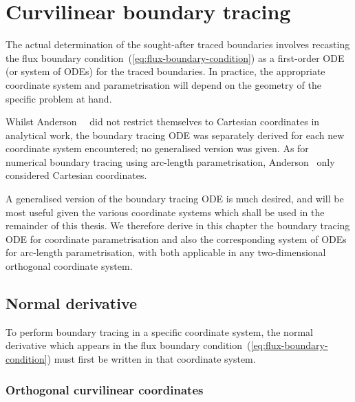 \chapter{Curvilinear boundary tracing}
\label{ch:curvilinear}

The actual determination of the sought-after traced boundaries involves
recasting the flux boundary condition~(\ref{eq:flux-boundary-condition})
as a first-order ODE (or system of ODEs) for the traced boundaries.
In practice, the appropriate coordinate system and parametrisation
will depend on the geometry of the specific problem at hand.

Whilst Anderson~\etal~\cite{
  anderson-2007-boundary-tracing-i-theory,
  anderson-2007-boundary-tracing-ii-applications
}
did not restrict themselves to Cartesian coordinates in analytical work,
the boundary tracing ODE was separately derived
for each new coordinate system encountered;
no generalised version was given.
As for numerical boundary tracing using arc-length parametrisation,
Anderson~\cite{anderson-2002-thesis-boundary-tracing-pdes}
only considered Cartesian coordinates.

A generalised version of the boundary tracing ODE is much desired,
and will be most useful given the various coordinate systems
which shall be used in the remainder of this thesis.
We therefore derive in this chapter
the boundary tracing ODE for coordinate parametrisation
and also the corresponding system of ODEs for arc-length parametrisation,
with both applicable in any two-dimensional orthogonal coordinate system.

\section{Normal derivative}
\label{sec:curvilinear.derivative}

To perform boundary tracing in a specific coordinate system,
the normal derivative which appears
in the flux boundary condition~(\ref{eq:flux-boundary-condition})
must first be written in that coordinate system.

\subsection{Orthogonal curvilinear coordinates}
\label{sec:curvilinear.derivative.orthogonal}

\begin{figure}
\end{figure}

